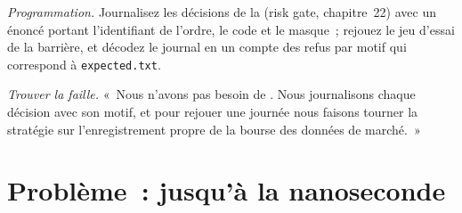 \begin{exercise}[$\star\star\star$]\label{exo:ll:logging-capture-and-replay:7}
\emph{Programmation.} Journalisez les décisions de la  (risk gate, chapitre~22) avec un énoncé portant l'identifiant de l'ordre, le code et le
masque~; rejouez le jeu d'essai de la barrière, et décodez le journal en un compte des refus par motif qui correspond à \texttt{expected.txt}.
\end{exercise}

\begin{exercise}[$\star\star\star$]\label{exo:ll:logging-capture-and-replay:8}
\emph{Trouver la faille.} «~Nous n'avons pas besoin de . Nous journalisons chaque décision avec son motif, et pour rejouer une journée nous faisons tourner la
stratégie sur l'enregistrement propre de la bourse des données de marché.~»
\end{exercise}

\section{Problème~: jusqu'à la nanoseconde}

